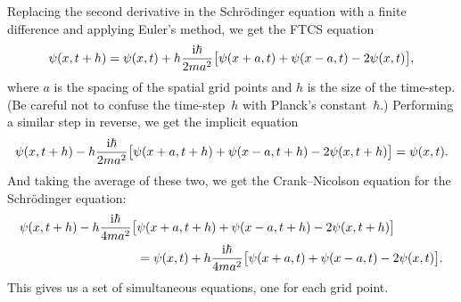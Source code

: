 \documentclass[12pt]{article}
\begin{document}
\begin{exercises}
Replacing the second derivative in the Schr\"odinger equation with a
finite difference and applying Euler's method, we get the FTCS equation
\begin{displaymath}
\psi(x,t+h) = \psi(x,t) + h {\mathrm{i}\hbar\over2ma^2} \bigl[ \psi(x+a,t)
              + \psi(x-a,t) - 2\psi(x,t) \bigr],
\end{displaymath}
where $a$ is the spacing of the spatial grid points and $h$ is the size of
the time-step.  (Be careful not to confuse the time-step~$h$ with Planck's
constant~$\hbar$.)  Performing a similar step in reverse, we get the
implicit equation
\begin{displaymath}
\psi(x,t+h) - h {\mathrm{i}\hbar\over2ma^2} \bigl[ \psi(x+a,t+h)
              + \psi(x-a,t+h) - 2\psi(x,t+h) \bigr] = \psi(x,t).
\end{displaymath}
And taking the average of these two, we get the Crank--Nicolson equation
for the Schr\"odinger equation:
\begin{align*}
\psi(x,t+h) - h {\mathrm{i}\hbar\over4ma^2} \bigl[ &\psi(x+a,t+h)
              + \psi(x-a,t+h) - 2\psi(x,t+h) \bigr] \nonumber\\
  &= \psi(x,t) + h {\mathrm{i}\hbar\over4ma^2} \bigl[ \psi(x+a,t)
              + \psi(x-a,t) - 2\psi(x,t) \bigr].
\end{align*}
This gives us a set of simultaneous equations, one for each grid point.


\end{exercises}
\end{document}
